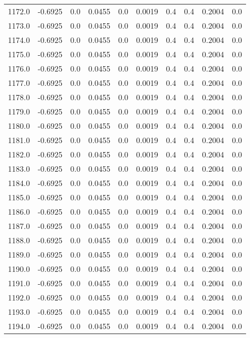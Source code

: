 \begin{longtable}{lrrrrrrrrr}
1172.0 & -0.6925 & 0.0 & 0.0455 & 0.0 & 0.0019 & 0.4 & 0.4 & 0.2004 & 0.0 \\
1173.0 & -0.6925 & 0.0 & 0.0455 & 0.0 & 0.0019 & 0.4 & 0.4 & 0.2004 & 0.0 \\
1174.0 & -0.6925 & 0.0 & 0.0455 & 0.0 & 0.0019 & 0.4 & 0.4 & 0.2004 & 0.0 \\
1175.0 & -0.6925 & 0.0 & 0.0455 & 0.0 & 0.0019 & 0.4 & 0.4 & 0.2004 & 0.0 \\
1176.0 & -0.6925 & 0.0 & 0.0455 & 0.0 & 0.0019 & 0.4 & 0.4 & 0.2004 & 0.0 \\
1177.0 & -0.6925 & 0.0 & 0.0455 & 0.0 & 0.0019 & 0.4 & 0.4 & 0.2004 & 0.0 \\
1178.0 & -0.6925 & 0.0 & 0.0455 & 0.0 & 0.0019 & 0.4 & 0.4 & 0.2004 & 0.0 \\
1179.0 & -0.6925 & 0.0 & 0.0455 & 0.0 & 0.0019 & 0.4 & 0.4 & 0.2004 & 0.0 \\
1180.0 & -0.6925 & 0.0 & 0.0455 & 0.0 & 0.0019 & 0.4 & 0.4 & 0.2004 & 0.0 \\
1181.0 & -0.6925 & 0.0 & 0.0455 & 0.0 & 0.0019 & 0.4 & 0.4 & 0.2004 & 0.0 \\
1182.0 & -0.6925 & 0.0 & 0.0455 & 0.0 & 0.0019 & 0.4 & 0.4 & 0.2004 & 0.0 \\
1183.0 & -0.6925 & 0.0 & 0.0455 & 0.0 & 0.0019 & 0.4 & 0.4 & 0.2004 & 0.0 \\
1184.0 & -0.6925 & 0.0 & 0.0455 & 0.0 & 0.0019 & 0.4 & 0.4 & 0.2004 & 0.0 \\
1185.0 & -0.6925 & 0.0 & 0.0455 & 0.0 & 0.0019 & 0.4 & 0.4 & 0.2004 & 0.0 \\
1186.0 & -0.6925 & 0.0 & 0.0455 & 0.0 & 0.0019 & 0.4 & 0.4 & 0.2004 & 0.0 \\
1187.0 & -0.6925 & 0.0 & 0.0455 & 0.0 & 0.0019 & 0.4 & 0.4 & 0.2004 & 0.0 \\
1188.0 & -0.6925 & 0.0 & 0.0455 & 0.0 & 0.0019 & 0.4 & 0.4 & 0.2004 & 0.0 \\
1189.0 & -0.6925 & 0.0 & 0.0455 & 0.0 & 0.0019 & 0.4 & 0.4 & 0.2004 & 0.0 \\
1190.0 & -0.6925 & 0.0 & 0.0455 & 0.0 & 0.0019 & 0.4 & 0.4 & 0.2004 & 0.0 \\
1191.0 & -0.6925 & 0.0 & 0.0455 & 0.0 & 0.0019 & 0.4 & 0.4 & 0.2004 & 0.0 \\
1192.0 & -0.6925 & 0.0 & 0.0455 & 0.0 & 0.0019 & 0.4 & 0.4 & 0.2004 & 0.0 \\
1193.0 & -0.6925 & 0.0 & 0.0455 & 0.0 & 0.0019 & 0.4 & 0.4 & 0.2004 & 0.0 \\
1194.0 & -0.6925 & 0.0 & 0.0455 & 0.0 & 0.0019 & 0.4 & 0.4 & 0.2004 & 0.0 \\

\end{longtable}
